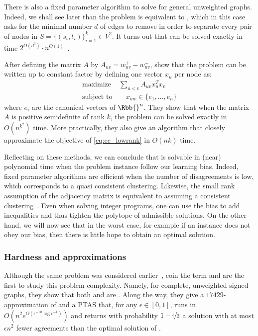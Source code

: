 There is also a fixed parameter algorithm to solve \mind{} for general unweighted graphs. Indeed, we
shall see later than the problem is equivalent to \mmc{}, which in this case asks for the minimal
number $d$ of edges to remove in order to separate every pair of nodes in $S=\{(s_i,t_i)\}_{i=1}^k
\in V^2$. It turns out that \mmc{} can be solved exactly in time $2^{O(d^3)}\cdot
n^{O(1)}$~\autocite{FPAMulticut14}.

After defining the matrix $A$ by $A_{uv} = w_{uv}^+ - w_{uv}^-$, \textcite{LowRank16} show that the
\maxa{} problem can be written up to constant factor by defining one vector $x_u$ per node as:
\begin{align}
   \label{eq:cc_lowrank}
   \text{maximize } & \sum_{u<v} A_{uv}x_u^Tx_v \\
   \text{subject to}& \quad x_{uw} \in \{e_1,\ldots, e_n\} \nonumber
\end{align}
where $e_i$ are the canonical vectors of $\Rbb{}^n$. They show that when the matrix $A$ is positive
semidefinite of rank $k$, the \pcc{} problem can be solved exactly in $O(n^{k^2})$ time. More
practically, they also give an algorithm that closely approximate the objective of
\eqref{eq:cc_lowrank} in $O(nk)$ time.

\bigskip

Reflecting on these methods, we can conclude that \pcc{} is solvable in (near) polynomial time
when the problem instance follow our learning bias. Indeed, fixed parameter algorithms are efficient
when the number of disagreements is low, which corresponds to a quasi consistent clustering.
Likewise, the small rank assumption of the adjacency matrix is equivalent to assuming a consistent
clustering~\autocite[Theorem 13]{LowRankCompletion14}. Even when solving integer programs, one can
use the bias to add inequalities and thus tighten the polytope of admissible solutions. On the other
hand, we will now see that in the worst case, for example if an instance does not obey our bias,
then there is little hope to obtain an optimal solution.

\subsubsection{Hardness and approximations}
\label{ssub:cc_harness_approx}

Although the same problem was considered earlier~\autocites{Early96}{Ben-Dor99}, \textcite{Bansal2002}
coin the term \pcc{} and are the first to study this problem complexity. Namely, for complete,
unweighted signed graphs, they show that both \mind{} and \maxa{} are \NPc{}. Along the way, they
give a $17429$-approximation of \mind{} and a PTAS%
that, for any $\epsilon \in [0,1]$, runs in
$O(n^2e^{O(\epsilon^{-10}\log \epsilon^{-1})})$ and returns with probability
$1-\nicefrac{\epsilon}{3}$ a solution with at most $\epsilon n^2$ fewer agreements than the optimal
solution of \maxa{}.

